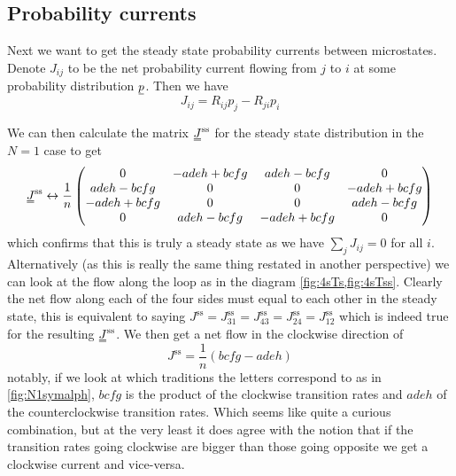 \documentclass[11pt]{article}
\newcommand{\suf}[2]{\stackunder[0.5pt]{\stackunder[1pt]{\ensuremath{#1}}{\rule{\widthof{\ensuremath{#2}}*\real{0.9}}{.1ex}}}{}}
\newcommand{\duf}[2]{\stackunder[0.5pt]{\stackunder[0.8pt]{\stackunder[1pt]{\ensuremath{#1}}{\rule{\widthof{\ensuremath{#2}}*\real{0.9}}{.1ex}}}{\rule{\widthof{\ensuremath{#2}}*\real{0.9}}{.1ex}}}{}}
\newcommand{\su}[1]{\suf{#1}{#1}}
\newcommand{\du}[1]{\duf{#1}{#1}}
\begin{document}
\subsection{Probability currents}
Next we want to get the steady state probability currents between microstates.
Denote $J_{ij}$ to be the net probability current flowing from $j$ to $i$ at some probability distribution $\su{p}$.
Then we have 
\begin{equation}\label{eq:current}
    J_{ij} = R_{ij}p_j-R_{ji}p_i
\end{equation}

We can then calculate the matrix $\du{J}^\text{ss}$ for the steady state distribution in the $N=1$ case to get
\begin{equation}
    \du{J}^\text{ss} \leftrightarrow \frac{1}{n} \begin{pmatrix}
        0 &  - a d e h + b c f g & a d e h - b c f g & 0 \\
        a d e h - b c f g & 0 & 0 &  - a d e h + b c f g \\
         - a d e h + b c f g & 0 & 0 & a d e h - b c f g \\
        0 & a d e h - b c f g &  - a d e h + b c f g & 0 \\
    \end{pmatrix}
\end{equation}
which confirms that this is truly a steady state as we have $\sum_j J_{ij} = 0$ for all $i$.
Alternatively (as this is really the same thing restated in another perspective) we can look at the flow along the loop as in the diagram \cref{fig:4sTs,fig:4sTss}.
Clearly the net flow along each of the four sides must equal to each other in the steady state, this is equivalent to saying $J^\text{ss}=J^\text{ss}_{31}=J^\text{ss}_{43}=J^\text{ss}_{24}=J^\text{ss}_{12}$ which is indeed true for the resulting $\du{J}^\text{ss}$.
We then get a net flow in the clockwise direction of
\begin{equation}
    J^\text{ss}=\frac{1}{n}(bcfg-adeh)
\end{equation}
notably, if we look at which traditions the letters correspond to as in \cref{fig:N1symalph}, $bcfg$ is the product of the clockwise transition rates and $adeh$ of the counterclockwise transition rates.
Which seems like quite a curious combination, but at the very least it does agree with the notion that if the transition rates going clockwise are bigger than those going opposite we get a clockwise current and vice-versa.
\end{document}
